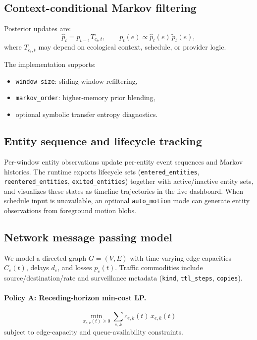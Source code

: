 \documentclass[11pt]{article}
\begin{document}
\subsection{Context-conditional Markov filtering}
Posterior updates are:
\begin{equation}
\hat{p}_t = p_{t-1} T_{c_t,t}, \qquad
p_t(e) \propto \hat{p}_t(e)\,\tilde{p}_t(e),
\end{equation}
where $T_{c_t,t}$ may depend on ecological context, schedule, or provider logic.

The implementation supports:
\begin{itemize}[leftmargin=1.5em]
  \item \texttt{window\_size}: sliding-window refiltering,
  \item \texttt{markov\_order}: higher-memory prior blending,
  \item optional symbolic transfer entropy diagnostics.
\end{itemize}

\subsection{Entity sequence and lifecycle tracking}
Per-window entity observations update per-entity event sequences and Markov histories. The runtime exports lifecycle sets (\texttt{entered\_entities}, \texttt{reentered\_entities}, \texttt{exited\_entities}) together with active/inactive entity sets, and visualizes these states as timeline trajectories in the live dashboard.
When schedule input is unavailable, an optional \texttt{auto\_motion} mode can generate entity observations from foreground motion blobs.

\subsection{Network message passing model}
We model a directed graph $G=(V,E)$ with time-varying edge capacities $C_e(t)$, delays $d_e$, and losses $p_e(t)$. Traffic commodities include source/destination/rate and surveillance metadata (\texttt{kind}, \texttt{ttl\_steps}, \texttt{copies}).

\paragraph{Policy A: Receding-horizon min-cost LP.}
\begin{equation}
\min_{x_{e,k}(t)\ge 0}\sum_{e,k} c_{e,k}(t)\,x_{e,k}(t)
\end{equation}
subject to edge-capacity and queue-availability constraints.
\end{document}
